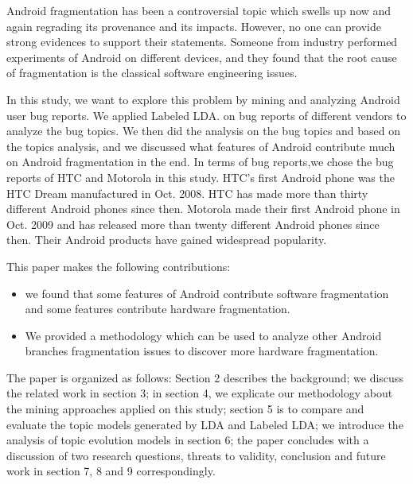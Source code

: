\documentclass[10pt, conference, compsocconf]{IEEEtran}
\begin{document}
Android fragmentation has been a controversial topic which swells up now and again regrading its provenance and its impacts.  However, no one can provide strong evidences to support their statements. Someone from industry performed experiments of Android on different devices, and they found that the root cause of fragmentation is the classical software engineering issues\cite{testing}.

In this study, we want to explore this problem by mining and analyzing Android user bug reports. We applied Labeled LDA\cite{labeledlda}. on bug reports of different vendors to analyze the bug topics. We then did the analysis on the bug topics and based on the topics analysis, and we discussed what features of Android contribute much on Android fragmentation in the end. In terms of bug reports,we chose the bug reports of HTC and Motorola in this study. HTC's first Android phone was the HTC Dream manufactured in Oct. 2008. HTC has made more than thirty different Android phones since then. Motorola made their first Android phone in Oct. 2009 and has released more than twenty different Android phones since then. Their Android products have gained widespread popularity.  
 
This paper makes the following contributions:
\begin{itemize}
\item we found that some features of Android contribute software fragmentation and some features contribute hardware fragmentation.
\end{itemize}

\begin{itemize}
\item We provided a methodology which can be used to analyze other Android branches fragmentation issues to discover more hardware fragmentation. 
\end{itemize}

The paper is organized as follows: Section 2 describes the background; we discuss the related work in section 3; in section 4, we explicate our methodology about the mining approaches applied on this study; section 5 is to compare and evaluate the topic models generated by LDA and Labeled LDA; we introduce the analysis of topic evolution models in section 6; the paper concludes with a discussion of two research questions, threats to validity, conclusion and future work in section 7, 8 and 9 correspondingly. 

\end{document}
